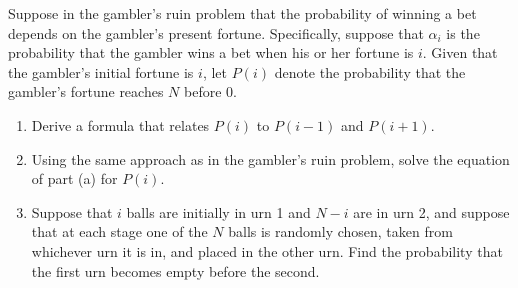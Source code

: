 \begin{exercise}%
\label{ex:markov-chains-61}
Suppose in the gambler's ruin problem that the probability of winning a bet depends on the gambler's present fortune. Specifically, suppose that $\alpha_i$ is the probability that the gambler wins a bet when his or her fortune is $i$. Given that the gambler's initial fortune is $i$, let $P(i)$ denote the probability that the gambler's fortune reaches $N$ before 0.
\begin{enumerate}
\item[(a)] Derive a formula that relates $P(i)$ to $P(i - 1)$ and $P(i + 1)$.
\item[(b)] Using the same approach as in the gambler's ruin problem, solve the equation of part (a) for $P(i)$.
\item[(c)] Suppose that $i$ balls are initially in urn 1 and $N - i$ are in urn 2, and suppose that at each stage one of the $N$ balls is randomly chosen, taken from whichever urn it is in, and placed in the other urn. Find the probability that the first urn becomes empty before the second.
\end{enumerate}
\end{exercise}
